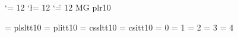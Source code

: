 %
%


%
%
\def\@Identical#1#2{%
  MG\fi
  \edef\@FirstString{#1}%
  \edef\@SecondString{#2}%
  \ifx \@FirstString \@SecondString
}
%
%
{%
 \catcode`\p = 12
 \catcode`\l = 12
 \catcode`\r = 12
 \xdef\xxx{plr10}
}
\if\@Identical{\xxx}{\fontname\tenrm}
  \font\tenttsl = plsltt10
  \font\tenttit = plitt10
\else
  \font\tenttsl = cssltt10
  \font\tenttit = csitt10
\fi
\let\IdentifierFont = \it
\let\TextFont = \sl
\let\KeywordFont = \bf
\let\CommentFont = \tenttit
\let\DirectiveFont = \tenttsl
\let\SymbolFont = \tt
\let\SpecialFont = \tt    %
%
%
\newif\if@TempBool            %
\newread\@InFile              %
\newcount\@CharCode           %
\newcount\@PrevChar           %
\newcount\@WhereAmI           %
\chardef\@NothingSpecial = 0
\chardef\@Text = 1
\chardef\@Directive = 2       %
\chardef\@ShortComment = 3    %
\chardef\@LongComment = 4     %
%
%
\def\neof#1{%
  MG\fi
  \ifeof#1
    \@TempBoolfalse
  \else
    \@TempBooltrue
  \fi
  \if@TempBool
}
%
%
\def\@TurnSpecialCharsOff{%
  \catcode`\/=12
  \catcode`\~=12
  \catcode`\#=12
  \catcode`\$=12
  \catcode`\%=12
  \catcode`\^=12
  \catcode`\&=12
  \catcode`\_=12
  \catcode`\\=12
  \catcode`\{=12
  \catcode`\}=12
  \catcode`\ =12
  \catcode`\^^M=12
}
%
%
\def\@PrepareCPas{%
  \begingroup
  \parindent=0pt
  \rightskip=0pt plus 1fil
  \@TurnSpecialCharsOff
  \def\@Word{}%
  \@WhereAmI = \@NothingSpecial
  \@PrevChar = 32
  \SymbolFont
}
